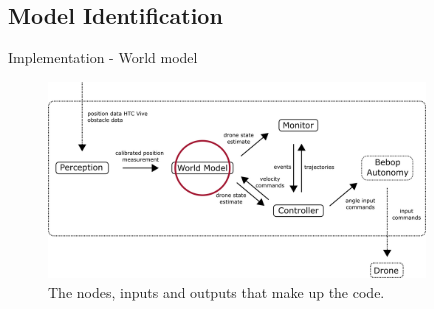 \subsection{Model Identification}
\label{subsec:Identification}

\begin{frame}{Implementation - World model}

    \begin{figure}[h]
    \centering
    \includegraphics[width=10cm]{Figures/code_structure_world_model.png}
    \caption{The nodes, inputs and outputs that make up the code.}
    \label{fig:code_struct}
    \end{figure}
    		
\end{frame}

